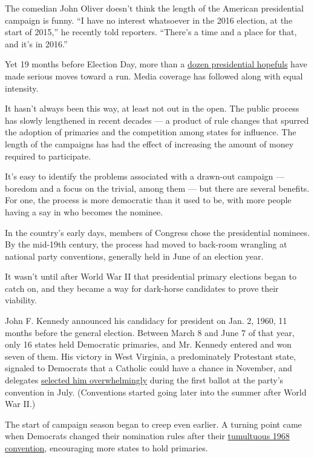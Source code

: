 The comedian John Oliver doesn't think the length of the American
presidential campaign is funny. ``I have no interest whatsoever in the
2016 election, at the start of 2015,'' he recently told reporters.
``There's a time and a place for that, and it's in 2016.''

Yet 19 months before Election Day, more than a
\href{http://www.nytimes3xbfgragh.onion/interactive/2015/us/politics/2016-presidential-candidates.html}{dozen
presidential hopefuls} have made serious moves toward a run. Media
coverage has followed along with equal intensity.

It hasn't always been this way, at least not out in the open. The public
process has slowly lengthened in recent decades --- a product of rule
changes that spurred the adoption of primaries and the competition among
states for influence. The length of the campaigns has had the effect of
increasing the amount of money required to participate.

It's easy to identify the problems associated with a drawn-out campaign
--- boredom and a focus on the trivial, among them --- but there are
several benefits. For one, the process is more democratic than it used
to be, with more people having a say in who becomes the nominee.

In the country's early days, members of Congress chose the presidential
nominees. By the mid-19th century, the process had moved to back-room
wrangling at national party conventions, generally held in June of an
election year.

It wasn't until after World War II that presidential primary elections
began to catch on, and they became a way for dark-horse candidates to
prove their viability.

John F. Kennedy announced his candidacy for president on Jan. 2, 1960,
11 months before the general election. Between March 8 and June 7 of
that year, only 16 states held Democratic primaries, and Mr. Kennedy
entered and won seven of them. His victory in West Virginia, a
predominately Protestant state, signaled to Democrats that a Catholic
could have a chance in November, and delegates
\href{http://timesmachine.nytimes3xbfgragh.onion/timesmachine/1960/07/14/99949548.html?pageNumber=1}{selected
him overwhelmingly} during the first ballot at the party's convention in
July. (Conventions started going later into the summer after World War
II.)

The start of campaign season began to creep even earlier. A turning
point came when Democrats changed their nomination rules after their
\href{http://timesmachine.nytimes3xbfgragh.onion/timesmachine/1968/08/28/76967975.html?pageNumber=1}{tumultuous
1968 convention}, encouraging more states to hold primaries.

